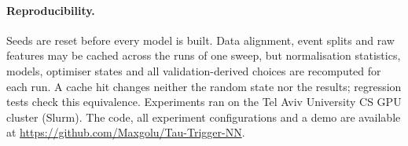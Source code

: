 \paragraph{Reproducibility.}
Seeds are reset before every model is built. Data alignment, event splits and raw features may be cached across the runs of one sweep, but normalisation statistics, models, optimiser states and all validation-derived choices are recomputed for each run. A cache hit changes neither the random state nor the results; regression tests check this equivalence. Experiments ran on the Tel Aviv University CS GPU cluster (Slurm). The code, all experiment configurations and a demo are available at \url{https://github.com/Maxgolu/Tau-Trigger-NN}.
